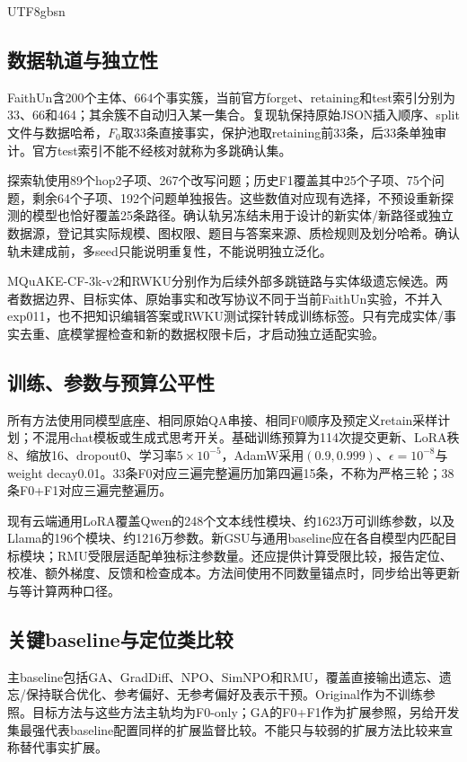 \documentclass[sigconf,anonymous,review]{acmart}
\begin{document}
\begin{CJK*}{UTF8}{gbsn}
\subsection{数据轨道与独立性}
FaithUn\cite{faithun}含200个主体、664个事实簇，当前官方forget、retaining和test索引分别为33、66和464；其余簇不自动归入某一集合。复现轨保持原始JSON插入顺序、split文件与数据哈希，$F_0$取33条直接事实，保护池取retaining前33条，后33条单独审计。官方test索引不能不经核对就称为多跳确认集。

探索轨使用89个hop2子项、267个改写问题；历史F1覆盖其中25个子项、75个问题，剩余64个子项、192个问题单独报告。这些数值对应现有选择，不预设重新探测的模型也恰好覆盖25条路径。确认轨另冻结未用于设计的新实体/新路径或独立数据源，登记其实际规模、图权限、题目与答案来源、质检规则及划分哈希。确认轨未建成前，多seed只能说明重复性，不能说明独立泛化。

MQuAKE-CF-3k-v2和RWKU分别作为后续外部多跳链路与实体级遗忘候选。两者数据边界、目标实体、原始事实和改写协议不同于当前FaithUn实验，不并入exp011，也不把知识编辑答案或RWKU测试探针转成训练标签。只有完成实体/事实去重、底模掌握检查和新的数据权限卡后，才启动独立适配实验。

\subsection{训练、参数与预算公平性}
所有方法使用同模型底座、相同原始QA串接、相同F0顺序及预定义retain采样计划；不混用chat模板或生成式思考开关。基础训练预算为114次提交更新、LoRA秩8、缩放16、dropout0、学习率$5\times10^{-5}$，AdamW采用$(0.9,0.999)$、$\epsilon=10^{-8}$与weight decay0.01。33条F0对应三遍完整遍历加第四遍15条，不称为严格三轮；38条F0+F1对应三遍完整遍历。

现有云端通用LoRA覆盖Qwen的248个文本线性模块、约1623万可训练参数，以及Llama的196个模块、约1216万参数。新GSU与通用baseline应在各自模型内匹配目标模块；RMU受限层适配单独标注参数量。还应提供计算受限比较，报告定位、校准、额外梯度、反馈和检查成本。方法间使用不同数量锚点时，同步给出等更新与等计算两种口径。

\subsection{关键baseline与定位类比较}
主baseline包括GA、GradDiff、NPO、SimNPO和RMU\cite{npo,simnpo,wmdp}，覆盖直接输出遗忘、遗忘/保持联合优化、参考偏好、无参考偏好及表示干预。Original作为不训练参照。目标方法与这些方法主轨均为F0-only；GA的F0+F1作为扩展参照，另给开发集最强代表baseline配置同样的扩展监督比较。不能只与较弱的扩展方法比较来宣称替代事实扩展。


\end{CJK*}
\end{document}
